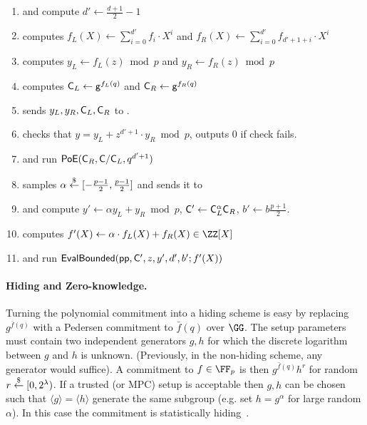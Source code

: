\documentclass{article}
\theoremstyle{definition}
\begin{document}
\begin{mdframed}
\begin{minipage}{\textwidth}
\begin{enumerate}[nolistsep]
        \item \pcind[1] \prover and \verifier compute $d' \gets \frac{d+1}{2} - 1$
        \item \pcind[1] \prover computes $f_L(X) \gets \sum\limits_{i=0}^{d'} f_i \cdot X^i$ and $f_R(X)\gets\sum\limits_{i=0}^{d'} f_{d'+1+i}\cdot X^{i}$
        \item \pcind[1] \prover computes $y_L\gets f_L(z) \bmod p$ and $y_R\gets f_R(z)\bmod p$
        \item \pcind[1] \prover computes $\mathsf{C}_L \gets \mathsf{g}^{f_L(q)}$ and $\mathsf{C}_R \gets \mathsf{g}^{f_R(q)}$
        \item \pcind[1] \prover sends $y_L,y_R, \mathsf{C}_L, \mathsf{C}_R$ to \verifier. 
        \item \pcind[1] \verifier checks that $y=y_L+z^{d'+1}\cdot y_R \bmod p$, outputs $0$ if check fails.
        \item \pcind[1] \label{line:PoE} \prover and \verifier run $\textsf{{PoE}}(\mathsf{C}_R, \mathsf{C}/\mathsf{C}_L, q^{d'+1})$
        \item \pcind[1] \verifier samples $\alpha \overset{\$}{\gets} [-\frac{p-1}{2},\frac{p-1}{2}]$ and sends it to \prover
        \item \pcind[1] \prover and \verifier compute $y'\gets\alpha  y_L +y_R \bmod p$, $\mathsf{C}' \gets \mathsf{C}_L^\alpha  \mathsf{C}_R$, $b'\gets b \frac{p+1}{2}$. 
        \item \pcind[1] \prover computes $f'(X) \gets \alpha \cdot f_L(X) + f_R(X) \in \ZZ[X]$ 
        \item \pcind[1] \prover and \verifier run $\textsf{{EvalBounded}}(\textsf{pp}, \mathsf{C}', z, y', d',b' ; f'(X))$
               \end{enumerate}
      \end{minipage}
\end{mdframed}

\paragraph{Hiding and Zero-knowledge.} Turning the polynomial commitment into a hiding scheme is easy by replacing $g^{\bar{f}(q)}$ with a Pedersen commitment to $\bar{f}(q)$ over $\GG$. The setup parameters must contain two independent generators $g, h$ for which the discrete logarithm between $g$ and $h$ is unknown. (Previously, in the non-hiding scheme, any generator would suffice). A commitment to $f \in \FF_p$ is then $g^{\bar{f}(q)} h^r$ for random $r \overset{\$}{\gets} [0, 2^\lambda)$. If a trusted (or MPC) setup is acceptable then $g, h$ can be chosen such that $\langle g \rangle = \langle h \rangle$ generate the same subgroup (e.g. set $h = g^\alpha$ for large random $\alpha$). In this case the commitment is statistically hiding~\cite{AC:DamFuj02}. 
\end{document}
